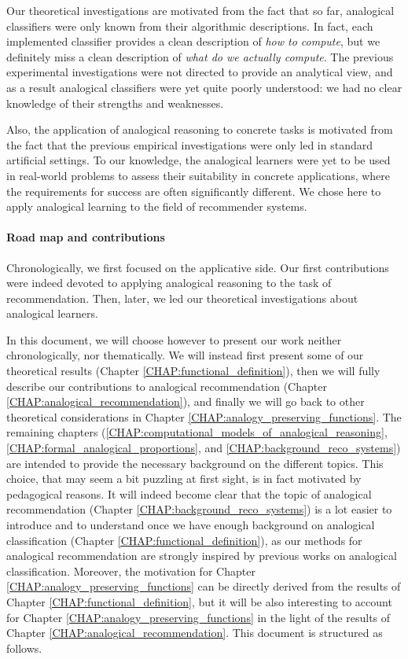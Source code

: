 Our theoretical investigations are motivated from the fact that so far,
analogical classifiers were only known from their algorithmic descriptions.
In fact, each implemented classifier provides a clean description
of {\it how to compute}, but we definitely miss a clean description of {\it
what do we actually compute}. The previous experimental investigations were not
directed to provide an analytical view, and as a result analogical classifiers
were yet quite poorly understood: we had no clear knowledge of their strengths
and weaknesses.

Also, the application of analogical reasoning to concrete tasks is motivated
from the fact that the previous empirical investigations were only led in
standard artificial settings. To our knowledge, the analogical learners were yet
to be used in real-world problems to assess their suitability in concrete
applications, where the requirements for success are often significantly
different. We chose here to apply analogical learning to the field of
recommender systems.

\paragraph{Road map and contributions\\}

Chronologically, we first focused on the applicative side. Our first
contributions were indeed devoted to applying analogical reasoning to the task
of recommendation. Then, later, we led our theoretical investigations about
analogical learners.

In this document, we will choose however to present our work neither
chronologically, nor thematically. We will instead first present some of our
theoretical results (Chapter \ref{CHAP:functional_definition}), then we will
fully describe our contributions to analogical recommendation (Chapter
\ref{CHAP:analogical_recommendation}), and finally we will go back to other
theoretical considerations in Chapter \ref{CHAP:analogy_preserving_functions}.
The remaining chapters
(\ref{CHAP:computational_models_of_analogical_reasoning},
\ref{CHAP:formal_analogical_proportions}, and
\ref{CHAP:background_reco_systems}) are intended to provide the necessary
background on the different topics. This choice, that may seem a bit puzzling
at first sight, is in fact motivated by pedagogical reasons. It will indeed
become clear that the topic of analogical recommendation (Chapter
\ref{CHAP:background_reco_systems}) is a lot easier to
introduce and to understand once we have enough background on analogical
classification (Chapter \ref{CHAP:functional_definition}), as our methods for
analogical recommendation are strongly inspired by previous works on analogical
classification. Moreover, the motivation for Chapter
\ref{CHAP:analogy_preserving_functions} can be directly derived from the
results of Chapter \ref{CHAP:functional_definition}, but it will be also
interesting to account for Chapter \ref{CHAP:analogy_preserving_functions} in
the light of the results of Chapter \ref{CHAP:analogical_recommendation}.  This
document is structured as follows.\\

